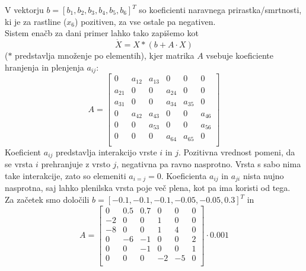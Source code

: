 \documentclass[a4paper, 12pt]{article}
\begin{document}
V vektorju $ b = \left[b_{1}, b_{2}, b_{3}, b_{4}, b_{5}, b_{6}\right]^{T} $ so koeficienti naravnega prirastka/smrtnosti,
ki je za rastline ($ x_{6} $) pozitiven, za vse ostale pa negativen. \\
Sistem enačb za dani primer lahko tako zapišemo kot
\begin{equation}
	\dot X = X*(b+A\cdot X)
\end{equation}
($ * $ predstavlja množenje po elementih),
kjer matrika $ A $ vsebuje koeficiente hranjenja in plenjenja $ a_{ij} $:
\begin{equation}
	A =
	\begin{bmatrix}
		0 & a_{12} & a_{13} & 0 & 0 & 0 \\
		a_{21} & 0 & 0 & a_{24} & 0 & 0 \\
		a_{31} & 0 & 0 & a_{34} & a_{35} & 0 \\
		0 & a_{42} & a_{43} & 0 & 0 & a_{46} \\
		0 & 0 & a_{53} & 0 & 0 & a_{56} \\
		0 & 0 & 0 & a_{64} & a_{65} & 0 \\
	\end{bmatrix}
\end{equation}
Koeficient $ a_{ij} $ predstavlja interakcijo vrste $ i $ in $ j $. Pozitivna vrednost pomeni, da se vrsta
$ i $ prehranjuje z vrsto $ j $, negativna pa ravno nasprotno. Vrsta s sabo nima take interakcije, zato
so elemeniti $ a_{i=j} = 0 $. Koeficienta $ a_{ij} $ in $ a_{ji} $ nista nujno nasprotna, saj lahko plenilska
vrsta poje več plena, kot pa ima koristi od tega. \\
Za začetek smo določili $ b = \left[-0.1, -0.1, -0.1, -0.05, -0.05, 0.3\right]^{T} $
in 
\begin{equation}
	A = 
	\begin{bmatrix}
		0 & 0.5 & 0.7 & 0 & 0 & 0 \\
		-2 & 0 & 0 & 1 & 0 & 0 \\
		-8 & 0 & 0 & 1 & 4 & 0 \\
		0 & -6 & -1 & 0 & 0 & 2 \\
		0 & 0 & -1 & 0 & 0 & 1 \\
		0 & 0 & 0 & -2 & -5 & 0 \\
	\end{bmatrix}\cdot 0.001
\end{equation}
\end{document}
